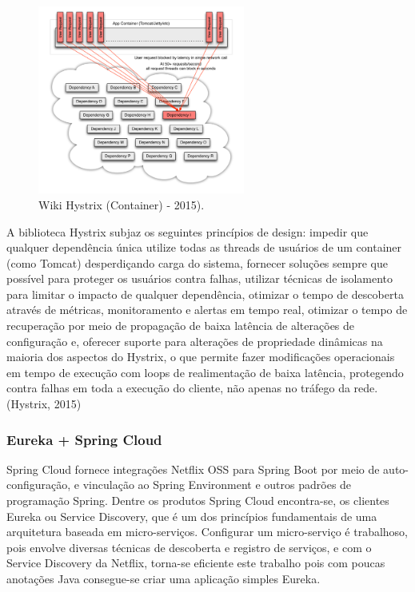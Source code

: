 \documentclass[journal]{IEEEtran}
\begin{document}
\begin{figure}[h]
\centering
\includegraphics[height=6.2cm]{figura5}
\caption{Wiki Hystrix (Container) - 2015).}
\label{fig:hystrix-container}
\end{figure}

A biblioteca Hystrix subjaz os seguintes princípios de design: impedir que qualquer dependência única utilize todas as threads de usuários de um container (como Tomcat) desperdiçando carga do sistema, fornecer soluções sempre que possível para proteger os usuários contra falhas, utilizar técnicas de isolamento para limitar o impacto de qualquer dependência, otimizar o tempo de descoberta através de métricas, monitoramento e alertas em tempo real, otimizar o tempo de recuperação por meio de propagação de baixa latência de alterações de configuração e, oferecer suporte para alterações de propriedade dinâmicas na maioria dos aspectos do Hystrix, o que permite fazer modificações operacionais em tempo de execução com loops de realimentação de baixa latência, protegendo contra falhas em toda a execução do cliente, não apenas no tráfego da rede. (Hystrix, 2015)

\subsubsection{Eureka + Spring Cloud}
Spring Cloud fornece integrações Netflix OSS para Spring Boot por meio de auto-configuração, e vinculação ao Spring Environment e outros padrões de programação Spring. Dentre os produtos Spring Cloud encontra-se, os clientes Eureka ou Service Discovery, que é um dos princípios fundamentais de uma arquitetura baseada em micro-serviços. Configurar um micro-serviço é trabalhoso, pois envolve diversas técnicas de descoberta e registro de serviços, e com o Service Discovery da Netflix, torna-se eficiente este trabalho pois com poucas anotações Java consegue-se criar uma aplicação simples Eureka. 
\end{document}
